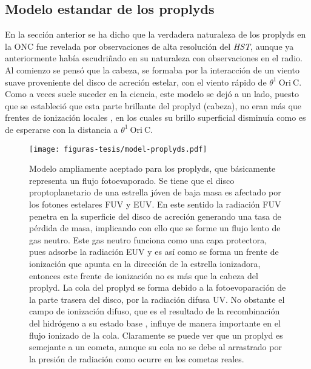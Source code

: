 \subsection{Modelo estandar de los proplyds}
\label{sec:modelo}

En la sección anterior se ha dicho que la verdadera naturaleza de los proplyds en la ONC fue revelada por observaciones de alta resolución del \textit{HST}, aunque ya anteriormente \citet{Churchwell:1987} había escudriñado en su naturaleza con observaciones en el radio. Al comienzo se pensó que la cabeza, se formaba por la interacción de un viento suave proveniente del disco de acreción estelar, con el viento rápido de \(\theta^1\ \text{Ori}\ \text{C}\). Como a veces suele suceder en la ciencia, este modelo se dejó a un lado, puesto que se estableció que esta parte brillante del proplyd (cabeza), no eran más que frentes de ionización locales \citep{Odell:1994}, en los cuales su brillo superficial disminuía como es de esperarse con la distancia a \(\theta^1\ \text{Ori}\ \text{C}\).\\

\begin{figure}
  \centering
  \texttt{[image: figuras-tesis/model-proplyds.pdf]}
  \caption{Modelo ampliamente aceptado para los proplyds, que básicamente representa un flujo fotoevaporado. Se tiene que el disco proptoplanetario de una estrella jóven de baja masa es afectado por los fotones estelares FUV y EUV. En este sentido la radiación FUV penetra en la superficie del disco de acreción generando una tasa de pérdida de masa, implicando con ello que se forme un flujo lento de gas neutro. Este gas neutro funciona como una capa protectora, pues adsorbe la radiación EUV y es así como se forma un frente de ionización que apunta en la dirección de la estrella ionizadora, entonces este frente de ionización no es más que la cabeza del proplyd. La cola del proplyd se forma debido a la fotoevoparación de la parte trasera  del disco, por la radiación difusa UV. No obstante el campo de ionización difuso, que es el resultado de la recombinación del hidrógeno a su estado base \citep{Henney:1999a}, influye de manera importante en el flujo ionizado de la cola. Claramente se puede ver que un proplyd es semejante a un cometa, aunque su cola no se debe al arrastrado por la presión de radiación como ocurre en los cometas reales. }
  \label{fig:modelo-proplyd}
\end{figure}

